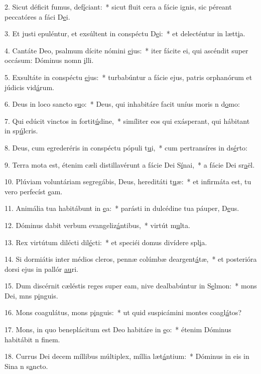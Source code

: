 2. Sicut déficit fumus, def\uline{í}ciant:~* sicut fluit cera a fácie ignis, sic péreant peccatóres a fáci D\uline{e}i.\par 
3. Et justi epuléntur, et exsúltent in conspéctu D\uline{e}i:~* et delecténtur in lætt\uline{i}a.\par 
4. Cantáte Deo, psalmum dícite nómini \uline{e}jus:~* iter fácite ei, qui ascéndit super occásum: Dóminus nomn \uline{i}lli.\par 
5. Exsultáte in conspéctu \uline{e}jus:~* turbabúntur a fácie ejus, patris orphanórum et júdicis vid\uline{á}rum.\par 
6. Deus in loco sancto s\uline{u}o:~* Deus, qui inhabitáre facit uníus moris n d\uline{o}mo:\par 
7. Qui edúcit vinctos in fortit\uline{ú}dine,~* simíliter eos qui exásperant, qui hábitant in sp\uline{ú}lcris.\par 
8. Deus, cum egrederéris in conspéctu pópuli t\uline{u}i,~* cum pertransíres in ds\uline{é}rto:\par 
9. Terra mota est, étenim cæli distillavérunt a fácie Dei S\uline{í}nai,~* a fácie Dei sr\uline{a}ël.\par 
10. Plúviam voluntáriam segregábis, Deus, hereditáti t\uline{u}æ:~* et infirmáta est, tu vero perfecíst \uline{e}am.\par 
11. Animália tua habitábunt in \uline{e}a:~* parásti in dulcédine tua páuper, D\uline{e}us.\par 
12. Dóminus dabit verbum evangeliz\uline{á}ntibus,~* virtút m\uline{u}lta.\par 
13. Rex virtútum dilécti dil\uline{é}cti:~* et speciéi domus divídere spl\uline{i}a.\par 
14. Si dormiátis inter médios cleros, pennæ colúmbæ deargent\uline{á}tæ,~* et posterióra dorsi ejus in pallór \uline{au}ri.\par 
15. Dum discérnit cæléstis reges super eam, nive dealbabúntur in S\uline{e}lmon:~* mons Dei, mns p\uline{i}nguis.\par 
16. Mons coagulátus, mons p\uline{i}nguis:~* ut quid suspicámini montes coagl\uline{á}tos?\par 
17. Mons, in quo beneplácitum est Deo habitáre in \uline{e}o:~* étenim Dóminus habitábit n f\uline{i}nem.\par 
18. Currus Dei decem míllibus múltiplex, míllia læt\uline{á}ntium:~* Dóminus in eis in Sina n s\uline{a}ncto.\par 
